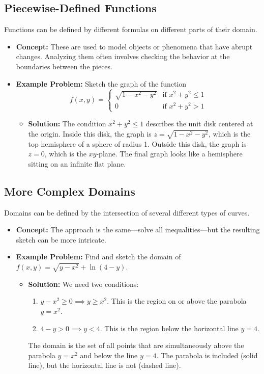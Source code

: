 \documentclass{article}
\begin{document}
\subsection{Piecewise-Defined Functions}
Functions can be defined by different formulas on different parts of their domain.
\begin{itemize}
    \item \textbf{Concept:} These are used to model objects or phenomena that have abrupt changes. Analyzing them often involves checking the behavior at the boundaries between the pieces.
    \item \textbf{Example Problem:} Sketch the graph of the function
    \[ f(x, y) = \begin{cases} \sqrt{1 - x^2 - y^2} & \text{if } x^2+y^2 \le 1 \\ 0 & \text{if } x^2+y^2 > 1 \end{cases} \]
    \begin{itemize}
        \item \textbf{Solution:} The condition $x^2+y^2 \le 1$ describes the unit disk centered at the origin. Inside this disk, the graph is $z = \sqrt{1-x^2-y^2}$, which is the top hemisphere of a sphere of radius 1. Outside this disk, the graph is $z=0$, which is the $xy$-plane. The final graph looks like a hemisphere sitting on an infinite flat plane.
    \end{itemize}
\end{itemize}

\subsection{More Complex Domains}
Domains can be defined by the intersection of several different types of curves.
\begin{itemize}
    \item \textbf{Concept:} The approach is the same—solve all inequalities—but the resulting sketch can be more intricate.
    \item \textbf{Example Problem:} Find and sketch the domain of $f(x, y) = \sqrt{y-x^2} + \ln(4-y)$.
    \begin{itemize}
        \item \textbf{Solution:} We need two conditions:
        \begin{enumerate}
            \item $y - x^2 \ge 0 \implies y \ge x^2$. This is the region on or above the parabola $y=x^2$.
            \item $4 - y > 0 \implies y < 4$. This is the region below the horizontal line $y=4$.
        \end{enumerate}
        The domain is the set of all points that are simultaneously above the parabola $y=x^2$ and below the line $y=4$. The parabola is included (solid line), but the horizontal line is not (dashed line).
    \end{itemize}
\end{itemize}
\end{document}
